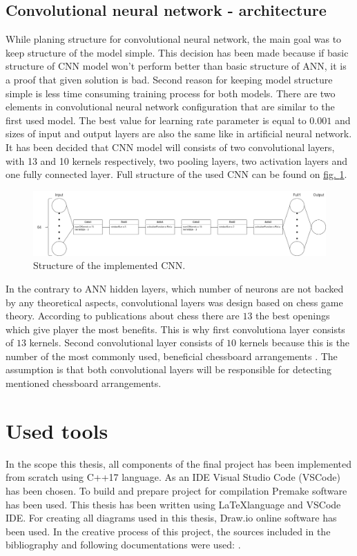 \subsection{Convolutional neural network - architecture}\label{sec:cnn-architecture}
While planing structure for convolutional neural network, the main goal was to keep structure of the model simple. This decision has been made because if basic structure of CNN model won't perform better than basic structure of ANN, it is a proof that given solution is bad. Second reason for keeping model structure simple is less time consuming training process for both models. There are two elements in convolutional neural network configuration that are similar to the first used model. The best value for learning rate parameter is equal to $0.001$ and sizes of input and output layers are also the same like in artificial neural network. It has been decided that CNN model will consists of two convolutional layers, with 13 and 10 kernels respectively, two pooling layers, two activation layers and one fully connected layer. Full structure of the used CNN can be found on \hyperref[fig:cnn-structure]{fig. \ref*{fig:cnn-structure}}.
\begin{figure}
	\centering
	\includegraphics[width=\textwidth]{dependencies/pictures/CNN_Structure.png}
	\caption{Structure of the implemented CNN.}
	\label{fig:cnn-structure}
\end{figure}
In the contrary to ANN hidden layers, which number of neurons are not backed by any theoretical aspects, convolutional layers was design based on chess game theory. According to publications about chess there are $13$ the best openings which give player the most benefits. This is why first convolutiona layer consists of $13$ kernels. Second convolutional layer consists of $10$ kernels because this is the number of the most commonly used, beneficial chessboard arrangements \cite{bib:book-mastering-chess-logic,bib:book-chess-bible,bib:book-bobby-fisher-teaches-chess}. The assumption is that both convolutional layers will be responsible for detecting mentioned chessboard arrangements.

\section{Used tools}
In the scope this thesis, all components of the final project has been implemented from scratch using C++17 language. As an IDE Visual Studio Code (VSCode) has been chosen. To build and prepare project for compilation Premake software has been used. This thesis has been written using \LaTeX language and VSCode IDE. For creating all diagrams used in this thesis, Draw.io online software has been used. In the creative process of this project, the sources included in the bibliography and following documentations were used: \cite{bib:internet-c++-doc,bib:internet-latex-doc,bib:internet-vscode-doc,bib:internet-premake-doc}.

